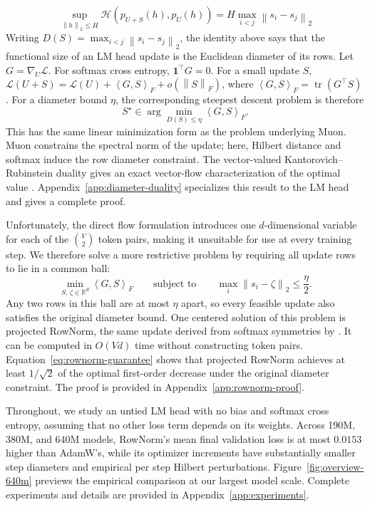 \documentclass[anon]{opt2026} %
\newcommand{\R}{\mathbb{R}}
\newcommand{\one}{\mathbf{1}}
\newcommand{\norm}[1]{\left\lVert #1\right\rVert}
\newcommand{\inner}[2]{\left\langle #1,#2\right\rangle}
\begin{document}
\[
\sup_{\norm{h}_2\le H} \mathcal{H}\!\left(p_{U+S}(h), p_U(h)\right) = H\max_{i<j}\norm{s_i - s_j}_2
\]
Writing $D(S)=\max_{i<j}\norm{s_i-s_j}_2$, the identity above says that the functional size of an LM head update is the Euclidean diameter of its rows.
Let $G=\nabla_U\mathcal L$. For softmax cross entropy, $\one^\top G=0$. For a small update $S$, $\mathcal L(U+S) = \mathcal L(U)+\inner{G}{S}_F+o(\norm{S}_F)$,
where $\inner{G}{S}_F=\operatorname{tr}(G^\top S)$. For a diameter bound $\eta$, the corresponding steepest descent problem is therefore
\[
S^\star\in
\arg\min_{D(S)\leq\eta}
\inner{G}{S}_F.
\]
This has the same linear minimization form as the problem underlying Muon.
Muon constrains the spectral norm of the update; here, Hilbert distance and softmax induce the row diameter constraint.
The vector-valued Kantorovich--Rubinstein duality gives an exact vector-flow characterization of the optimal value
\citep{ciosmak2021optimaltransportvectormeasures, robertson2025generalizationwassersteindistancebeckmann}.
Appendix~\ref{app:diameter-duality} specializes this result to the LM head and gives a complete proof.

Unfortunately, the direct flow formulation introduces one $d$-dimensional variable for each of the $\binom{V}{2}$ token pairs, making it unsuitable for use at every training step. We therefore solve a more restrictive problem by requiring all update rows to lie in a common ball:
\[
\min_{S,\,\zeta\in\R^d}
\inner{G}{S}_F
\qquad\text{subject to}\qquad
\max_i\norm{s_i-\zeta}_2\leq\frac{\eta}{2}.
\]
Any two rows in this ball are at most $\eta$ apart, so every feasible update also satisfies the original diameter bound.
One centered solution of this problem is projected RowNorm, the same update derived from softmax symmetries by \citet{lau2026symmetry}.
It can be computed in $O(Vd)$ time without constructing token pairs.
Equation~\ref{eq:rownorm-guarantee} shows that projected RowNorm achieves at least $1/\sqrt{2}$ of the optimal first-order decrease under the original diameter constraint. The proof is provided in Appendix~\ref{app:rownorm-proof}.

Throughout, we study an untied LM head with no bias and softmax cross entropy, assuming that no other loss term depends on its weights.
Across 190M, 380M, and 640M models, RowNorm's mean final validation loss is at most $0.0153$ higher than AdamW's, while its optimizer increments have substantially smaller step diameters and empirical per step Hilbert perturbations. Figure~\ref{fig:overview-640m} previews the empirical comparison at our largest model scale. Complete experiments and details are provided in Appendix~\ref{app:experiments}.
\end{document}
